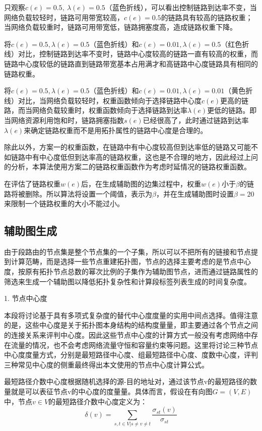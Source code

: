 只观察$c(e)=0.5,\ \lambda(e)=0.5$（蓝色折线），可以看出控制链路到达率不变，当网络负载较轻时，链路可用带宽较高，$c(e)=0.5$的链路具有较高的链路权重；当网络负载较重时，链路可用带宽低，链路拥塞度高，造成链路权重下降。

将$c(e)=0.5,\lambda(e)=0.5$（蓝色折线）和$c\left(e\right)=0.01,\lambda\left(e\right)=0.5$（红色折线）对比，控制链路到达率不变时，链路中心度较高的链路一直有较高的权重，而链路中心度较低的链路直到链路带宽基本占用满才和高链路中心度链路具有相同的链路权重。

将$c(e)=0.5,\lambda(e)=0.5$（蓝色折线）和$c\left(e\right)=0.01,\lambda\left(e\right)=0.01$（黄色折线）对比，当网络负载较轻时，权重函数倾向于选择链路中心度$c\left(e\right)$更高的链路，而当网络负载较重时，权重函数倾向于选择链路到达率$\lambda\left(e\right)$更低的链路。即当网络资源利用饱和时，链路拥塞指数$s\left(e\right)$已经很高了，此时通过链路到达率$\lambda\left(e\right)$来确定链路权重而不是用拓扑属性的链路中心度是合理的。

除此以外，方案一的权重函数，在链路中有中心度较高但到达率低的链路又可能不如链路中有中心度低但到达率高的链路权重，这也是不合理的地方，因此经过上问的分析，本算法使用方案二的链路权重函数作为考虑时延情况的链路权重函数。

在评估了链路权重$w\left(e\right)$后，在生成辅助图的边集过程中，权重$w\left(e\right)$小于$\beta$的链路将被删除。所以算法将设置一个阈值，表示为$\beta$，并在生成辅助图时设置$\beta=20$来限制一个链路权重的大小不能过小。

\subsection{辅助图生成}

由于段路由的节点集是整个节点集的一个子集，所以可以不把所有的链接和节点提到计算范畴，而是选择一些节点重建拓扑图，节点的选择主要考虑的是节点中心度，按原有拓扑节点总数的幂次比例的子集作为辅助图节点，进而通过链路属性的筛选来生成一个辅助图以降低拓扑复杂性和计算段标签列表生成的时间复杂度。

1. 节点中心度

本段将讨论基于具有多项式复杂度的替代中心度度量的实用中间点选择。值得注意的是，这些中心度是关于拓扑图本身结构的结构度量量，即主要通过各个节点之间的连接关系来评判中心度。因此这些节点中心度的计算方式一般没有考虑网络中存在流量的情况，也不会考虑网络流量守恒和容量约束等问题。这里将讨论三种节点中心度度量方式，分别是最短路径中心度、组最短路径中心度、度数中心度，评判三种常见中心度的侧重最终得出本文使用的节点中心度计算公式。

最短路径介数中心度根据随机选择的源-目的地址对，通过该节点v的最短路径的数量就是可以表征节点v的中心度的度量量。具体而言，假设在有向图$G=\left(V,E\right)$中，节点$v \in V$的最短路径介数中心度定义为：
$$\delta\left(v\right)=\sum_{s,t\in V|s\neq v\neq t}\frac{\sigma_{st}\left(v\right)}{\sigma_{st}}$$

